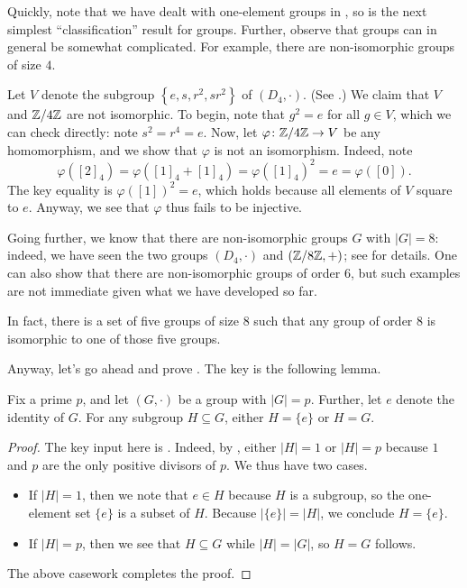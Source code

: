 \documentclass[../main.tex]{subfiles}
\begin{document}
Quickly, note that we have dealt with one-element groups in , so  is the next simplest ``classification'' result for groups. Further, observe that groups can in general be somewhat complicated. For example, there are non-isomorphic groups of size $4$.
\begin{example}
    Let $V$ denote the subgroup $\left\{e,s,r^2,sr^2\right\}$ of $(D_4,\cdot)$. (See .) We claim that $V$ and $\mathbb Z/4\mathbb Z$ are not isomorphic. To begin, note that $g^2=e$ for all $g\in V$, which we can check directly: note $s^2=r^4=e$. Now, let $\varphi\colon\mathbb Z/4\mathbb Z\to V$ be any homomorphism, and we show that $\varphi$ is not an isomorphism. Indeed, note
    \[\varphi([2]_4)=\varphi([1]_4+[1]_4)=\varphi([1]_4)^2=e=\varphi([0]).\]
    The key equality is $\varphi([1])^2=e$, which holds because all elements of $V$ square to $e$. Anyway, we see that $\varphi$ thus fails to be injective.
\end{example}
Going further, we know that there are non-isomorphic groups $G$ with $|G|=8$: indeed, we have seen the two groups $(D_4,\cdot)$ and $(\mathbb Z/8\mathbb Z,+)$; see  for details. One can also show that there are non-isomorphic groups of order $6$, but such examples are not immediate given what we have developed so far.
\begin{remark}
    In fact, there is a set of five groups of size $8$ such that any group of order $8$ is isomorphic to one of those five groups.
\end{remark}
Anyway, let's go ahead and prove . The key is the following lemma.
\begin{lemma} \label{lem:subgroups-of-prime-order-group}
    Fix a prime $p$, and let $(G,\cdot)$ be a group with $\left|G\right|=p$. Further, let $e$ denote the identity of $G$. For any subgroup $H\subseteq G$, either $H=\{e\}$ or $H=G$.
\end{lemma}
\begin{proof}
    The key input here is . Indeed, by , either $\left|H\right|=1$ or $\left|H\right|=p$ because $1$ and $p$ are the only positive divisors of $p$. We thus have two cases.
    \begin{itemize}
        \item If $\left|H\right|=1$, then we note that $e\in H$ because $H$ is a subgroup, so the one-element set $\{e\}$ is a subset of $H$. Because $\left|\{e\}\right|=\left|H\right|$, we conclude $H=\{e\}$.
        \item If $\left|H\right|=p$, then we see that $H\subseteq G$ while $\left|H\right|=\left|G\right|$, so $H=G$ follows.
    \end{itemize}
    The above casework completes the proof.
\end{proof}
\end{document}
